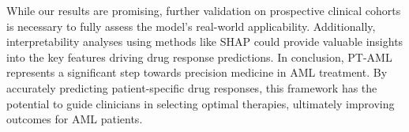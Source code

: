\documentclass[runningheads,10pt]{llncs}
\begin{document}
While our results are promising, further validation on prospective clinical cohorts is necessary to fully assess the model's real-world applicability. Additionally, interpretability analyses using methods like SHAP \cite{lundberg2017unified} could provide valuable insights into the key features driving drug response predictions. In conclusion, PT-AML represents a significant step towards precision medicine in AML treatment. By accurately predicting patient-specific drug responses, this framework has the potential to guide clinicians in selecting optimal therapies, ultimately improving outcomes for AML patients.




\end{document}
